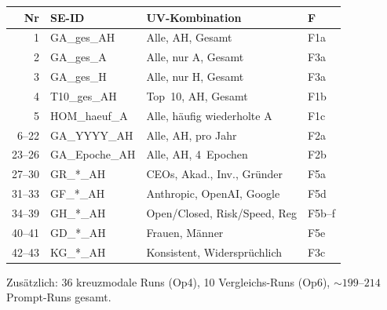 \documentclass[12pt,a4paper]{article}
\begin{document}
{\small
\begin{longtable}{r l l l}
  \toprule
  \textbf{Nr} & \textbf{SE-ID} & \textbf{UV-Kombination} & \textbf{F} \\
  \midrule
  \endfirsthead
  1 & GA\_ges\_AH & Alle, AH, Gesamt & F1a \\
  2 & GA\_ges\_A & Alle, nur A, Gesamt & F3a \\
  3 & GA\_ges\_H & Alle, nur H, Gesamt & F3a \\
  4 & T10\_ges\_AH & Top~10, AH, Gesamt & F1b \\
  5 & HOM\_haeuf\_A & Alle, h\"aufig wiederholte A & F1c \\
  6--22 & GA\_YYYY\_AH & Alle, AH, pro Jahr & F2a \\
  23--26 & GA\_Epoche\_AH & Alle, AH, 4~Epochen & F2b \\
  27--30 & GR\_*\_AH & CEOs, Akad., Inv., Gr\"under & F5a \\
  31--33 & GF\_*\_AH & Anthropic, OpenAI, Google & F5d \\
  34--39 & GH\_*\_AH & Open/Closed, Risk/Speed, Reg & F5b--f \\
  40--41 & GD\_*\_AH & Frauen, M\"anner & F5e \\
  42--43 & KG\_*\_AH & Konsistent, Widerspr\"uchlich & F3c \\
  \bottomrule
\end{longtable}
}

Zus\"atzlich: 36 kreuzmodale Runs (Op4), 10 Vergleichs-Runs (Op6), ${\sim}199$--$214$ Prompt-Runs gesamt.


\end{document}
